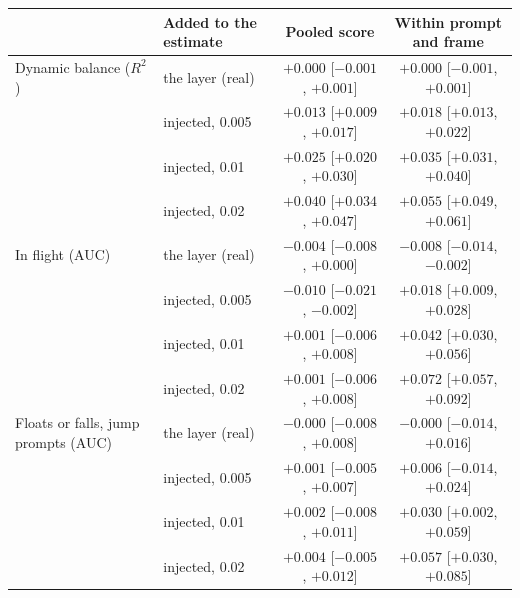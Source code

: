 \begin{tabular}{llcc}
\toprule
& Added to the estimate & Pooled score & Within prompt and frame \\
\midrule
Dynamic balance ($R^2$) & the layer (real) & $+0.000$ [$-0.001$, $+0.001$] & $+0.000$ [$-0.001$, $+0.001$] \\
 & injected, 0.005 & $+0.013$ [$+0.009$, $+0.017$] & $+0.018$ [$+0.013$, $+0.022$] \\
 & injected, 0.01 & $+0.025$ [$+0.020$, $+0.030$] & $+0.035$ [$+0.031$, $+0.040$] \\
 & injected, 0.02 & $+0.040$ [$+0.034$, $+0.047$] & $+0.055$ [$+0.049$, $+0.061$] \\
\addlinespace[2pt]
In flight (AUC) & the layer (real) & $-0.004$ [$-0.008$, $+0.000$] & $-0.008$ [$-0.014$, $-0.002$] \\
 & injected, 0.005 & $-0.010$ [$-0.021$, $-0.002$] & $+0.018$ [$+0.009$, $+0.028$] \\
 & injected, 0.01 & $+0.001$ [$-0.006$, $+0.008$] & $+0.042$ [$+0.030$, $+0.056$] \\
 & injected, 0.02 & $+0.001$ [$-0.006$, $+0.008$] & $+0.072$ [$+0.057$, $+0.092$] \\
\addlinespace[2pt]
Floats or falls, jump prompts (AUC) & the layer (real) & $-0.000$ [$-0.008$, $+0.008$] & $-0.000$ [$-0.014$, $+0.016$] \\
 & injected, 0.005 & $+0.001$ [$-0.005$, $+0.007$] & $+0.006$ [$-0.014$, $+0.024$] \\
 & injected, 0.01 & $+0.002$ [$-0.008$, $+0.011$] & $+0.030$ [$+0.002$, $+0.059$] \\
 & injected, 0.02 & $+0.004$ [$-0.005$, $+0.012$] & $+0.057$ [$+0.030$, $+0.085$] \\
\bottomrule
\end{tabular}
